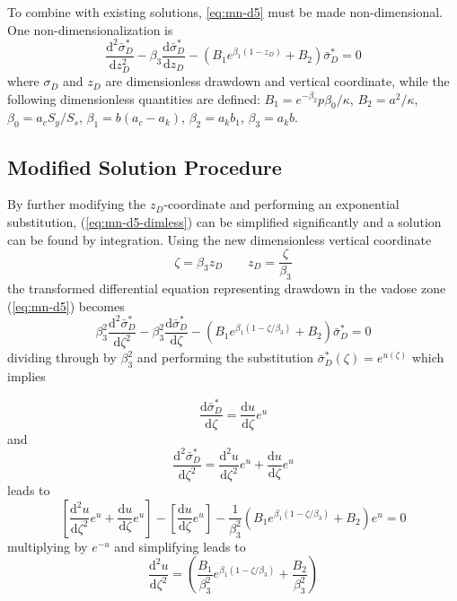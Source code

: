 \documentclass[12pt,letterpaper]{article}
\begin{document}
To combine with existing solutions, \eqref{eq:mn-d5} must be made
non-dimensional.  One non-dimensionalization is  
\begin{equation}
  \label{eq:mn-d5-dimless}
  \frac{\mathrm{d}^2 \bar{\sigma}_D^{\ast}}{\mathrm{d}z_D^2} - \beta_3 \frac{\mathrm{d} \bar{\sigma}_D^{\ast}}{\mathrm{d}z_D} - \left( B_1 e^{\beta_1 (1-z_D)} + B_2\right) \bar{\sigma}_D^{\ast}=0
\end{equation}
where $\sigma_D$ and $z_D$ are dimensionless drawdown and vertical
coordinate, while the following dimensionless quantities are defined:
$B_1 = e^{-\beta_2}  p \beta_0/\kappa $, 
$B_2=a^2/\kappa$, $\beta_0=a_c S_y/S_s$, $\beta_1=b(a_c - a_k)$,
$\beta_2=a_k b_1$, $\beta_3 = a_k b$.

\subsection{Modified Solution Procedure} 
By further modifying the $z_D$-coordinate and performing an exponential substitution, (\ref{eq:mn-d5-dimless}) can be simplified significantly and a solution can be found by integration.  Using the new dimensionless vertical coordinate 
\begin{equation}\nonumber
 \zeta=\beta_3 z_D \qquad z_D=\frac{\zeta}{\beta_3} 
\end{equation}
the transformed differential equation representing drawdown in the vadose zone (\ref{eq:mn-d5}) becomes
\begin{equation}
  \label{eq:nondimODE}
  \beta_3^2 \frac{\mathrm{d}^2
    \bar{\sigma}_D^{\ast}}{\mathrm{d}\zeta^2} - \beta_3^2
  \frac{\mathrm{d} \bar{\sigma}_D^{\ast}}{\mathrm{d}\zeta} - \left(
    B_1 e^{\beta_1 (1-\zeta/\beta_3)} + B_2\right) \bar{\sigma}_D^{\ast}=0
\end{equation}
dividing through by $\beta_3^2$ and performing the substitution
$\bar{\sigma}_D^{\ast}(\zeta)=e^{u(\zeta)}$ which implies

\begin{equation}\nonumber
\frac{\mathrm{d}\bar{\sigma}_D^{\ast}}{\mathrm{d}\zeta} =
\frac{\mathrm{d}u}{\mathrm{d}\zeta}e^u
\end{equation} 
and
\begin{equation}\nonumber
\frac{\mathrm{d}^2\bar{\sigma}_D^{\ast}}{\mathrm{d}\zeta^2} =
\frac{\mathrm{d}^2u}{\mathrm{d}\zeta^2}e^u +
\frac{\mathrm{d}u}{\mathrm{d}\zeta}e^u
\end{equation}
leads to
\begin{equation}\nonumber
 \left[ \frac{\mathrm{d}^2u}{\mathrm{d}\zeta^2}e^u +
  \frac{\mathrm{d}u}{\mathrm{d}\zeta}e^u \right]-  \left[
  \frac{\mathrm{d}u}{\mathrm{d}\zeta}e^u \right]- \frac{1}{\beta_3^2}\left( B_1 e^{\beta_1 (1-\zeta/\beta_3)} + B_2\right) e^{u}=0
\end{equation}
multiplying by $e^{-u}$ and simplifying leads to
\begin{equation}
  \label{eq:expsubODE}
   \frac{\mathrm{d}^2 u}{\mathrm{d}\zeta^2} = \left( \frac{B_1}{\beta_3^2} e^{\beta_1 (1-\zeta/\beta_3)} + \frac{B_2}{\beta_3^2}\right) 
\end{equation}
\end{document}
